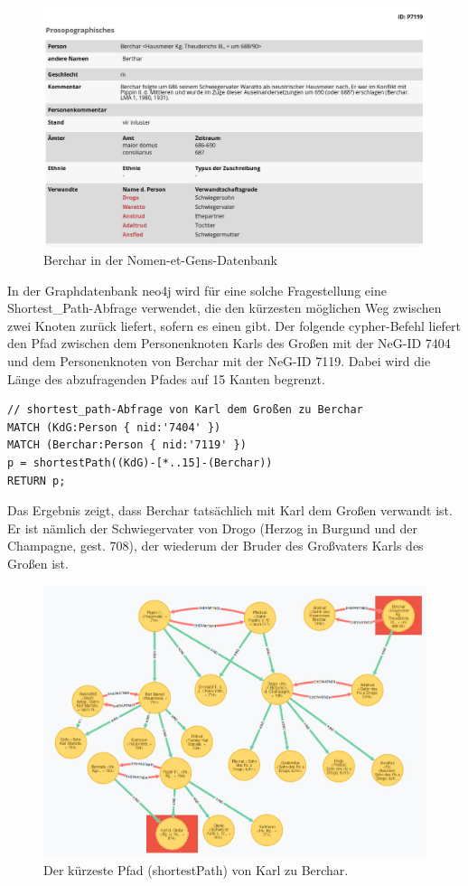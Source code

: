 \documentclass[ngerman,]{scrreprt}
\begin{document}
\begin{figure}
\centering
\includegraphics{Bilder/NeG/040-Berchar-DB-Eintrag.jpg}
\caption{Berchar in der Nomen-et-Gens-Datenbank}
\end{figure}

In der Graphdatenbank neo4j wird für eine solche Fragestellung eine Shortest\_Path-Abfrage verwendet, die den kürzesten möglichen Weg zwischen zwei Knoten zurück liefert, sofern es einen gibt. Der folgende cypher-Befehl liefert den Pfad zwischen dem Personenknoten Karls des Großen mit der NeG-ID 7404 und dem Personenknoten von Berchar mit der NeG-ID 7119. Dabei wird die Länge des abzufragenden Pfades auf 15 Kanten begrenzt.

\begin{verbatim}
// shortest_path-Abfrage von Karl dem Großen zu Berchar
MATCH (KdG:Person { nid:'7404' })
MATCH (Berchar:Person { nid:'7119' })
p = shortestPath((KdG)-[*..15]-(Berchar))
RETURN p;
\end{verbatim}

Das Ergebnis zeigt, dass Berchar tatsächlich mit Karl dem Großen verwandt ist. Er ist nämlich der Schwiegervater von Drogo (Herzog in Burgund und der Champagne, gest. 708), der wiederum der Bruder des Großvaters Karls des Großen ist.

\begin{figure}
\centering
\includegraphics{Bilder/NeG/050-Berchar-Karl-shortestpath.jpg}
\caption{Der kürzeste Pfad (shortestPath) von Karl zu Berchar.}
\end{figure}
\end{document}
